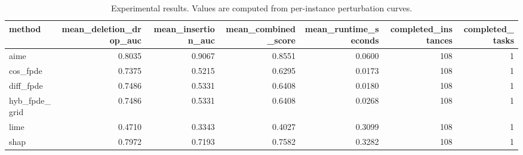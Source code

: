 \begin{table}[t]
\caption{Experimental results. Values are computed from per-instance perturbation curves.}
\label{tab:main_results_computed}
\centering
\begin{tabular}{lrrrrrr}
\toprule
method & mean\_deletion\_drop\_auc & mean\_insertion\_auc & mean\_combined\_score & mean\_runtime\_seconds & completed\_instances & completed\_tasks \\
\midrule
aime & 0.8035 & 0.9067 & 0.8551 & 0.0600 & 108 & 1 \\
cos\_fpde & 0.7375 & 0.5215 & 0.6295 & 0.0173 & 108 & 1 \\
diff\_fpde & 0.7486 & 0.5331 & 0.6408 & 0.0180 & 108 & 1 \\
hyb\_fpde\_grid & 0.7486 & 0.5331 & 0.6408 & 0.0268 & 108 & 1 \\
lime & 0.4710 & 0.3343 & 0.4027 & 0.3099 & 108 & 1 \\
shap & 0.7972 & 0.7193 & 0.7582 & 0.3282 & 108 & 1 \\
\bottomrule
\end{tabular}

\end{table}
